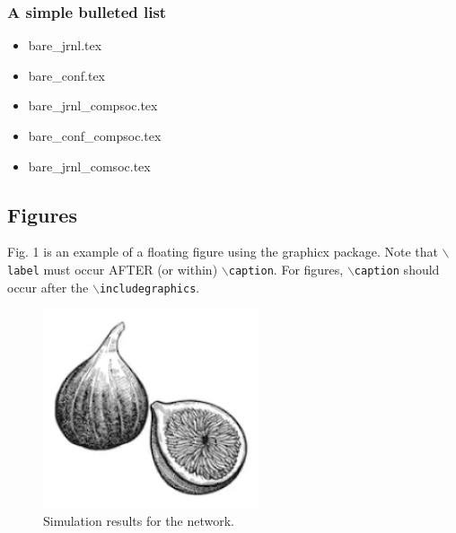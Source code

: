\documentclass[lettersize,journal]{IEEEtran}
\begin{document}
\subsubsection*{\bf A simple bulleted list}
\begin{itemize}
\item{bare\_jrnl.tex}
\item{bare\_conf.tex}
\item{bare\_jrnl\_compsoc.tex}
\item{bare\_conf\_compsoc.tex}
\item{bare\_jrnl\_comsoc.tex}
\end{itemize}





\subsection{Figures}
Fig. 1 is an example of a floating figure using the graphicx package.
 Note that $\backslash${\tt{label}} must occur AFTER (or within) $\backslash${\tt{caption}}.
 For figures, $\backslash${\tt{caption}} should occur after the $\backslash${\tt{includegraphics}}.

\begin{figure}[!t]
\centering
\includegraphics[width=2.5in]{fig1}
\caption{Simulation results for the network.}
\label{fig_1}
\end{figure}
\end{document}
